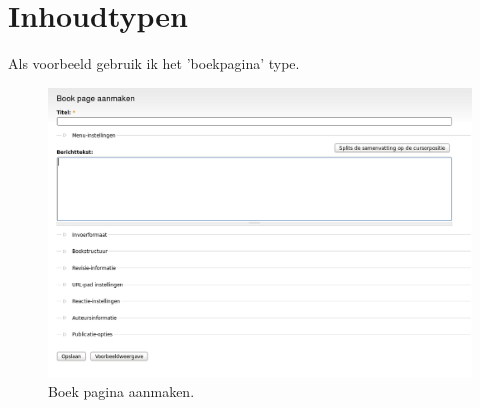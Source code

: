 \section{Inhoudtypen}
Als voorbeeld gebruik ik het 'boekpagina' type.
 \begin{figure}[!h]
    \centering
   \includegraphics[scale=0.3,angle=0]{book_page_aanmaken}
   \caption{Boek pagina aanmaken.\label{white}}
 \end{figure}

